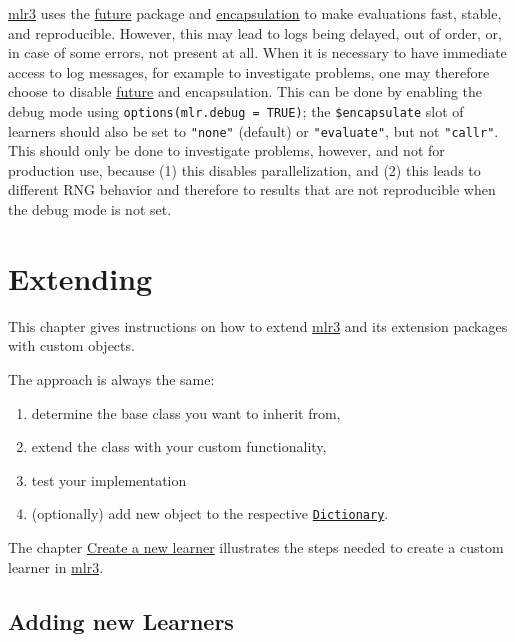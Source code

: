 \documentclass[
]{scrbook}
\providecommand{\tightlist}{%
  \setlength{\itemsep}{0pt}\setlength{\parskip}{0pt}}
\begin{document}
\href{https://mlr3.mlr-org.com}{mlr3} uses the \protect\hyperlink{parallelization}{future} package and \protect\hyperlink{encapsulation}{encapsulation} to make evaluations fast, stable, and reproducible.
However, this may lead to logs being delayed, out of order, or, in case of some errors, not present at all.
When it is necessary to have immediate access to log messages, for example to investigate problems, one may therefore choose to disable \href{https://cran.r-project.org/package=future}{future} and encapsulation.
This can be done by enabling the debug mode using \texttt{options(mlr.debug\ =\ TRUE)}; the \texttt{\$encapsulate} slot of learners should also be set to \texttt{"none"} (default) or \texttt{"evaluate"}, but not \texttt{"callr"}.
This should only be done to investigate problems, however, and not for production use, because (1) this disables parallelization, and (2) this leads to different RNG behavior and therefore to results that are not reproducible when the debug mode is not set.

\hypertarget{extending}{%
\chapter{Extending}\label{extending}}

This chapter gives instructions on how to extend \href{https://mlr3.mlr-org.com}{mlr3} and its extension packages with custom objects.

The approach is always the same:

\begin{enumerate}
\def\labelenumi{\arabic{enumi}.}
\tightlist
\item
  determine the base class you want to inherit from,
\item
  extend the class with your custom functionality,
\item
  test your implementation
\item
  (optionally) add new object to the respective \href{https://mlr3misc.mlr-org.com/reference/Dictionary.html}{\texttt{Dictionary}}.
\end{enumerate}

The chapter \protect\hyperlink{extending-learners}{Create a new learner} illustrates the steps needed to create a custom learner in \href{https://mlr3.mlr-org.com}{mlr3}.

\hypertarget{extending-learners}{%
\section{Adding new Learners}\label{extending-learners}}
\end{document}

